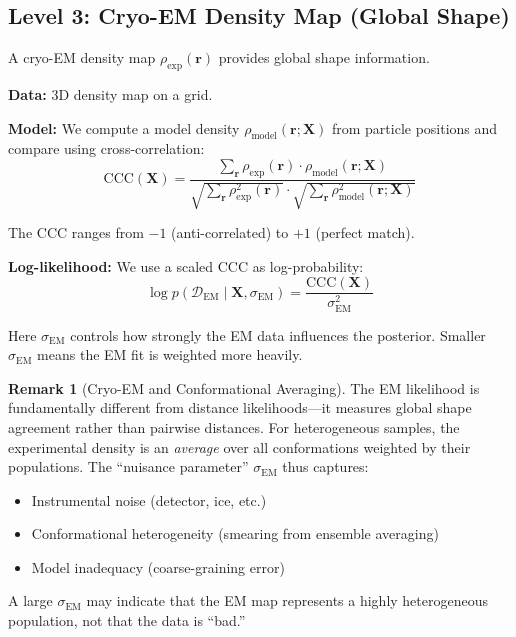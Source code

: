 \documentclass[11pt,a4paper]{article}
\newcommand{\bX}{\mathbf{X}}
\theoremstyle{definition}
\newtheorem{remark}{Remark}
\begin{document}
\subsection{Level 3: Cryo-EM Density Map (Global Shape)}

A cryo-EM density map $\rho_{\text{exp}}(\mathbf{r})$ provides global shape information.

\textbf{Data:} 3D density map on a grid.

\textbf{Model:} We compute a model density $\rho_{\text{model}}(\mathbf{r}; \bX)$ from particle positions and compare using cross-correlation:
\begin{equation}
    \text{CCC}(\bX) = \frac{\sum_{\mathbf{r}} \rho_{\text{exp}}(\mathbf{r}) \cdot \rho_{\text{model}}(\mathbf{r}; \bX)}
    {\sqrt{\sum_{\mathbf{r}} \rho_{\text{exp}}^2(\mathbf{r})} \cdot \sqrt{\sum_{\mathbf{r}} \rho_{\text{model}}^2(\mathbf{r}; \bX)}}
\end{equation}

The CCC ranges from $-1$ (anti-correlated) to $+1$ (perfect match).

\textbf{Log-likelihood:} We use a scaled CCC as log-probability:
\begin{equation}
    \log p(\mathcal{D}_{\text{EM}} \mid \bX, \sigma_{\text{EM}}) = \frac{\text{CCC}(\bX)}{\sigma_{\text{EM}}^2}
\end{equation}

Here $\sigma_{\text{EM}}$ controls how strongly the EM data influences the posterior. Smaller $\sigma_{\text{EM}}$ means the EM fit is weighted more heavily.

\begin{remark}[Cryo-EM and Conformational Averaging]
The EM likelihood is fundamentally different from distance likelihoods---it measures global shape agreement rather than pairwise distances. For heterogeneous samples, the experimental density is an \textit{average} over all conformations weighted by their populations. The ``nuisance parameter'' $\sigma_{\text{EM}}$ thus captures:
\begin{itemize}
    \item Instrumental noise (detector, ice, etc.)
    \item Conformational heterogeneity (smearing from ensemble averaging)
    \item Model inadequacy (coarse-graining error)
\end{itemize}
A large $\sigma_{\text{EM}}$ may indicate that the EM map represents a highly heterogeneous population, not that the data is ``bad.''
\end{remark}
\end{document}

